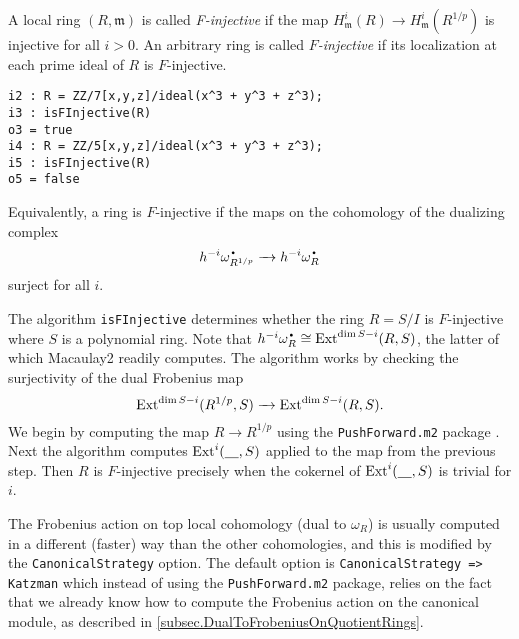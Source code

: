 \documentclass{amsart}
\begin{document}
\begin{definition}
A local ring $(R, \mathfrak{m})$ is called \emph{F-injective} if the map
$H^{i}_{\mathfrak{m}}(R) \rightarrow H^{i}_{\mathfrak{m}}(R^{1/p})$ is
injective for all $i >0$. An arbitrary ring is called \emph{$F$-injective} if its
localization at each prime ideal of $R$ is $F$-injective.
\end{definition}



\medskip
\begin{verbatim}
i2 : R = ZZ/7[x,y,z]/ideal(x^3 + y^3 + z^3);
i3 : isFInjective(R)
o3 = true
i4 : R = ZZ/5[x,y,z]/ideal(x^3 + y^3 + z^3);
i5 : isFInjective(R)
o5 = false
\end{verbatim}
\medskip

Equivalently, a ring is $F$-injective if the maps on the cohomology of the dualizing complex
\[
h^{-i} \omega_{R^{1/p}}^{\mydot} \to h^{-i} \omega_R^{\mydot}
\]
surject for all $i$.

The algorithm \texttt{isFInjective} determines whether the ring $R = S/I$ is
$F$-injective where $S$ is a polynomial ring.  Note that $h^{-i} \omega_R^{\mydot} \cong \Ext^{\dim S - i}(R, S)$, the latter of which Macaulay2 readily computes.
The algorithm works by checking the surjectivity of the dual Frobenius map
\[
\operatorname{Ext}^{\dim S - i}(R^{1/p}, S) \xrightarrow{\ \ } \operatorname{Ext}^{\dim S - i}(R, S).
\]
We begin by computing the map $R
\rightarrow R^{1/p}$ using the \texttt{PushForward.m2} package \cite{PushForward}.
Next the algorithm computes
$\operatorname{Ext}^{i}( \underline{\hskip 10pt}, S)$ applied to the map from the previous step.  Then $R$ is $F$-injective precisely when the
cokernel of $\operatorname{Ext}^{i}( \underline{\hskip 10pt}, S)$ is trivial for $i$.

The Frobenius action on top local cohomology (dual to $\omega_R$) is usually computed in a different (faster) way than the other cohomologies, and this is modified by the \texttt{CanonicalStrategy} option.  The default option is \texttt{CanonicalStrategy => Katzman} which instead of using the \texttt{PushForward.m2} package, relies on the fact that we already know how to compute the Frobenius action on the canonical module, as described in \autoref{subsec.DualToFrobeniusOnQuotientRings}.


\end{document}
